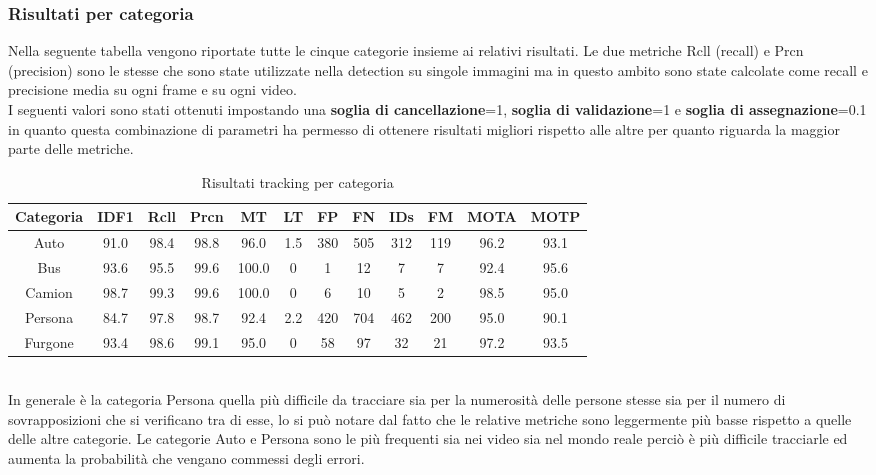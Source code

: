\subsubsection{Risultati per categoria}
Nella seguente tabella vengono riportate tutte le cinque categorie insieme ai relativi risultati. Le due metriche Rcll (recall) e Prcn (precision) sono le stesse che sono state utilizzate nella detection su singole immagini ma in questo ambito sono state calcolate come recall e precisione media su ogni frame e su ogni video.\\
I seguenti valori sono stati ottenuti impostando una \textbf{soglia di cancellazione}=1, \textbf{soglia di validazione}=1 e \textbf{soglia di assegnazione}=0.1 in quanto questa combinazione di parametri ha permesso di ottenere risultati migliori rispetto alle altre per quanto riguarda la maggior parte delle metriche.
\begin{table}[h!]
\centering
\begin{tabular}{|c|c|c|c|c|c|c|c|c|c|c|c|} 
\hline
Categoria & IDF1 & Rcll & Prcn & MT & LT & FP & FN & IDs & FM & MOTA & MOTP\\ [0.5ex] 
\hline
Auto & 91.0 & 98.4 & 98.8 & 96.0 & 1.5 & 380 & 505 & 312 & 119 & 96.2 & 93.1 \\
Bus & 93.6 & 95.5 & 99.6 & 100.0 & 0 & 1 & 12 & 7 & 7 & 92.4 & 95.6 \\
Camion & 98.7 & 99.3 & 99.6 & 100.0 & 0 & 6 & 10 & 5 & 2 & 98.5 & 95.0 \\
Persona & 84.7 & 97.8 & 98.7 & 92.4 & 2.2 & 420 & 704 & 462 & 200 & 95.0 & 90.1 \\
Furgone & 93.4 & 98.6 & 99.1 & 95.0 & 0 & 58 & 97 & 32 & 21 & 97.2 & 93.5\\
\hline
\end{tabular}
\caption{Risultati tracking per categoria}
\label{risultati tracking categoria}
\end{table}
\\
In generale è la categoria Persona quella più difficile da tracciare sia per la numerosità delle persone stesse sia per il numero di sovrapposizioni che si verificano tra di esse, lo si può notare dal fatto che le relative metriche sono leggermente più basse rispetto a quelle delle altre categorie.  Le categorie Auto e Persona sono le più frequenti sia nei video sia nel mondo reale perciò è più difficile tracciarle ed aumenta la probabilità che vengano commessi degli errori.

\clearpage
